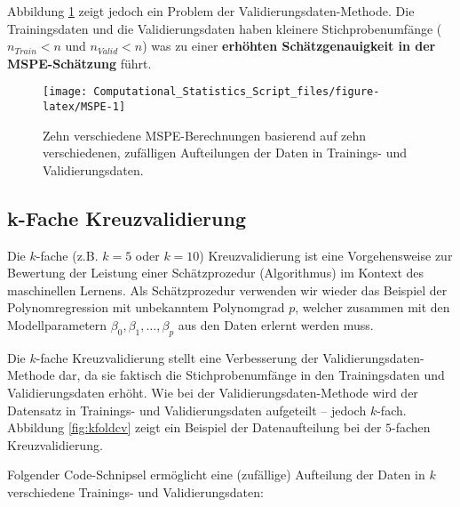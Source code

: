 \documentclass[
  ngerman,
]{book}
\begin{document}
Abbildung \ref{fig:MSPE} zeigt jedoch ein Problem der Validierungsdaten-Methode. Die Trainingsdaten und die Validierungsdaten haben kleinere Stichprobenumfänge (\(n_{Train}<n\) und \(n_{Valid}<n\)) was zu einer \textbf{erhöhten Schätzgenauigkeit in der MSPE-Schätzung} führt.

\begin{figure}[h]

{\centering \texttt{[image: Computational\_Statistics\_Script\_files/figure-latex/MSPE-1]} 

}

\caption{Zehn verschiedene MSPE-Berechnungen basierend auf zehn verschiedenen, zufälligen Aufteilungen der Daten in Trainings- und Validierungsdaten.}\label{fig:MSPE}
\end{figure}

\hypertarget{k-fache-kreuzvalidierung}{%
\subsection{k-Fache Kreuzvalidierung}\label{k-fache-kreuzvalidierung}}

Die \(k\)-fache (z.B. \(k=5\) oder \(k=10\)) Kreuzvalidierung ist eine Vorgehensweise zur Bewertung der Leistung einer Schätzprozedur (Algorithmus) im Kontext des maschinellen Lernens. Als Schätzprozedur verwenden wir wieder das Beispiel der Polynomregression mit unbekanntem Polynomgrad \(p\), welcher zusammen mit den Modellparametern \(\beta_0,\beta_1,\dots,\beta_p\) aus den Daten erlernt werden muss.

Die \(k\)-fache Kreuzvalidierung stellt eine Verbesserung der Validierungsdaten-Methode dar, da sie faktisch die Stichprobenumfänge in den Trainingsdaten und Validierungsdaten erhöht. Wie bei der Validierungsdaten-Methode wird der Datensatz in Trainings- und Validierungsdaten aufgeteilt -- jedoch \(k\)-fach. Abbildung \ref{fig:kfoldcv} zeigt ein Beispiel der Datenaufteilung bei der \(5\)-fachen Kreuzvalidierung.

Folgender Code-Schnipsel ermöglicht eine (zufällige) Aufteilung der Daten in \(k\) verschiedene Trainings- und Validierungsdaten:
\end{document}
